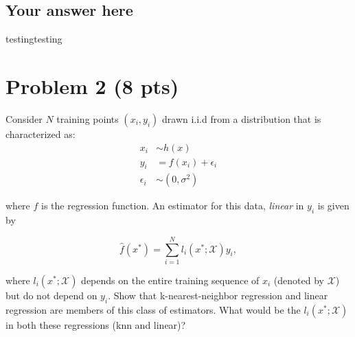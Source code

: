 \documentclass{article}
\begin{document}
\subsection*{Your answer here}

testingtesting


\section*{Problem 2 (8 pts)}

Consider $N$ training points $(x_i, y_i)$ drawn i.i.d from a distribution that is characterized as: 
\begin{align}
x_i &\sim h(x) \\
y_i &= f(x_i) + \epsilon_i \\
\epsilon_i &\sim (0, \sigma^2) 
\end{align}

where $f$ is the regression function. An estimator for this data, \emph{linear} in $y_i$ is given by

\begin{equation}
    \hat f(x^*) = \sum_{i=1}^{N} l_i(x^* ; \mathcal{X})y_i, 
\end{equation}

where $l_i(x^*; \mathcal{X})$ depends on the entire training sequence of $x_i$ (denoted by $\mathcal{X}$)  but do not depend on $y_i$. Show that k-nearest-neighbor regression and linear regression are members of this class of estimators. What would be the $l_i(x^* ; \mathcal{X})$ in both these regressions (knn and linear)? 
\end{document}
